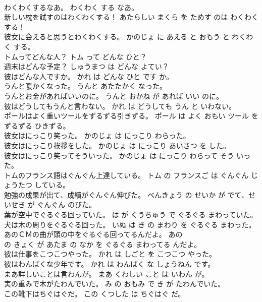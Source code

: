 \documentclass[8pt]{extreport}
\begin{document}
\begin{CJK}{UTF8}{min}
\\	わくわくするなあ。	わくわく する なあ。	
\\	新しい枕を試すのはわくわくする！	あたらしい まくら を ためす のは わくわく する！	
\\	彼女に会えると思うとわくわくする。	かのじょ に あえる と おもう と わくわく する。	
\\	トムってどんな人？	トム って どんな ひと？	
\\	週末はどんな予定？	しゅうまつ は どんな よてい？	
\\	彼はどんな人ですか。	かれ は どんな ひと です か。	
\\	うんと暖かくなった。	うんと あたたかく なった。	
\\	うんとお金があればいいのに。	うんと おかね が あれば いい のに。	
\\	彼はどうしてもうんと言わない。	かれ は どうしても うん と いわない。	
\\	ポールはよく重いツールをずるずる引きずる。	ポール は よく おもい ツール を ずるずる ひきずる。	
\\	彼女はにっこり笑った。	かのじょ は にっこり わらった。	
\\	彼女はにっこり挨拶をした。	かのじょ は にっこり あいさつ を した。	
\\	彼女はにっこり笑ってそういった。	かのじょ は にっこり わらって そう いった。	
\\	トムのフランス語はぐんぐん上達している。	トム の フランスご は ぐんぐん じょうたつ している。	
\\	勉強の成果が出て、成績がぐんぐん伸びた。	べんきょう の せいか が でて、せいせき が ぐんぐん のびた。	
\\	葉が空中でぐるぐる回っていた。	は が くうちゅう で ぐるぐる まわっていた。	
\\	犬は木の周りをぐるぐる回った。	いぬ は き の まわり を ぐるぐる まわった。	
\\	あのＣＭの曲が頭の中をぐるぐる回ってるんだよ。	あの 
\\	の きょく が あたま の なか を ぐるぐる まわってる んだよ。	
\\	彼は仕事をこつこつやった。	かれ は しごと を こつこつ やった。	
\\	彼はわんぱくな少年です。	かれ は わんぱく な しょうねん です。	
\\	まあ詳しいことは言わんが。	まあ くわしい こと は いわん が。	
\\	実の重みで木がたわんでいた。	み の おもみ で き が たわんでいた。	
\\	この靴下はちぐはぐだ。	この くつした は ちぐはぐ だ。	

\end{CJK}
\end{document}

